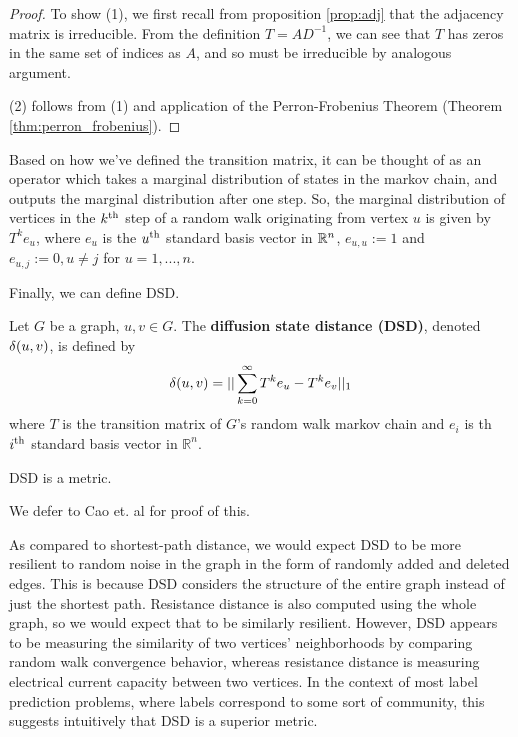 \begin{proof}
  To show (1), we first recall from proposition \ref{prop:adj} that the adjacency matrix is
  irreducible. From the definition $T = AD^{-1}$, we can see that $T$ has zeros in the same set of
  indices as $A$, and so must be irreducible by analogous argument.

  (2) follows from (1) and application of the Perron-Frobenius Theorem (Theorem
  \ref{thm:perron_frobenius}).
\end{proof}

Based on how we've defined the transition matrix, it can be thought of as an operator which takes a
marginal distribution of states in the markov chain, and outputs the marginal distribution after one
step. So, the marginal distribution of vertices in the $k^{\mathrm{th}}$ step of a random walk originating
from vertex $u$ is given by $T^ke_u$, where $e_u$ is the $u^{\mathrm{th}}$ standard basis vector in $\mathbb{R}^n$,
$e_{u,u} := 1$ and $e_{u,j} := 0, u \neq j$ for $u=1,...,n$.

Finally, we can define DSD.

\begin{definition}
  Let $G$ be a graph, $u,v \in G$. The \textbf{diffusion state distance (DSD)}, denoted $\delta(u,v)$,
  is defined by
  \[
    \delta(u,v) = ||\sum_{k =0}^{\infty}{T^ke_u - T^ke_v}||_1
  \]
  where $T$ is the transition matrix of $G$'s random walk markov chain and $e_i$ is th $i^{\mathrm{th}}$
  standard basis vector in $\mathbb{R}^n$.
\end{definition}

\begin{theorem}
  DSD is a metric.
\end{theorem}

We defer to Cao et. al for proof of this.

As compared to shortest-path distance, we would expect DSD to be more resilient to random noise in
the graph in the form of randomly added and deleted edges. This is because DSD considers the
structure of the entire graph instead of just the shortest path. Resistance distance is also
computed using the whole graph, so we would expect that to be similarly resilient. However, DSD
appears to be measuring the similarity of two vertices' neighborhoods by comparing random walk
convergence behavior, whereas resistance distance is measuring electrical current capacity between
two vertices. In the context of most label prediction problems, where labels correspond to some sort
of community, this suggests intuitively that DSD is a superior metric.


